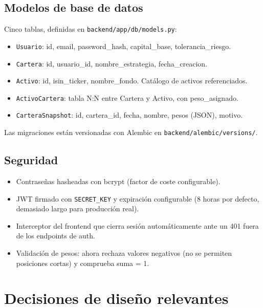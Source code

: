 \documentclass[11pt,a4paper]{article}
\begin{document}
\subsection{Modelos de base de datos}

Cinco tablas, definidas en \texttt{backend/app/db/models.py}:

\begin{itemize}
  \item \texttt{Usuario}: id, email, password\_hash, capital\_base, tolerancia\_riesgo.
  \item \texttt{Cartera}: id, usuario\_id, nombre\_estrategia, fecha\_creacion.
  \item \texttt{Activo}: id, isin\_ticker, nombre\_fondo. Catálogo de activos referenciados.
  \item \texttt{ActivoCartera}: tabla N:N entre Cartera y Activo, con peso\_asignado.
  \item \texttt{CarteraSnapshot}: id, cartera\_id, fecha, nombre, pesos (JSON), motivo.
\end{itemize}

Las migraciones están versionadas con Alembic en \texttt{backend/alembic/versions/}.

\subsection{Seguridad}

\begin{itemize}
  \item Contraseñas hasheadas con bcrypt (factor de coste configurable).
  \item JWT firmado con \texttt{SECRET\_KEY} y expiración configurable (8 horas por defecto, demasiado largo para producción real).
  \item Interceptor del frontend que cierra sesión automáticamente ante un 401 fuera de los endpoints de auth.
  \item Validación de pesos: ahora rechaza valores negativos (no se permiten posiciones cortas) y comprueba suma = 1.
\end{itemize}

\section{Decisiones de diseño relevantes}
\end{document}
